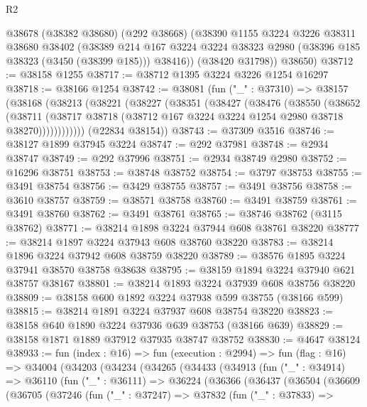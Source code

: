 \begin{lexlean}{R2}
\begin{coremodule}
      @38678
        (@38382 @38680)
        (@292 @38668)
        (@38390
          @1155
          @3224
          @3226
          @38311
          @38680
          @38402
          (@38389
            @214
            @167
            @3224
            @3224
            @38323
            @2980
            (@38396 @185 @38323 (@3450 (@38399 @185)))
            @38416))
        (@38420 @31798))
      @38650)
@38712 := @38158 @1255
@38717 := @38712 @1395 @3224 @3226 @1254 @16297
@38718 := @38166 @1254
@38742 := @38081
    (fun ("_" : @37310) =>
    @38157
      (@38168
        (@38213
          (@38221
            (@38227
              (@38351
                (@38427
                  (@38476
                    (@38550
                      (@38652
                        (@38711
                          (@38717
                            @38718
                            (@38712 @167 @3224 @3224 @1254 @2980 @38718 @38270))))))))))))
      (@22834 @38154))
@38743 := @37309 @3516
@38746 := @38127 @1899 @37945 @3224
@38747 := @292 @37981
@38748 := @2934 @38747
@38749 := @292 @37996
@38751 := @2934 @38749 @2980
@38752 := @16296 @38751
@38753 := @38748 @38752
@38754 := @3797 @38753
@38755 := @3491 @38754
@38756 := @3429 @38755
@38757 := @3491 @38756
@38758 := @3610 @38757
@38759 := @38571 @38758
@38760 := @3491 @38759
@38761 := @3491 @38760
@38762 := @3491 @38761
@38765 := @38746 @38762 (@3115 @38762)
@38771 := @38214 @1898 @3224 @37944 @608 @38761 @38220
@38777 := @38214 @1897 @3224 @37943 @608 @38760 @38220
@38783 := @38214 @1896 @3224 @37942 @608 @38759 @38220
@38789 := @38576 @1895 @3224 @37941 @38570 @38758 @38638
@38795 := @38159 @1894 @3224 @37940 @621 @38757 @38167
@38801 := @38214 @1893 @3224 @37939 @608 @38756 @38220
@38809 := @38158 @600 @1892 @3224 @37938 @599 @38755 (@38166 @599)
@38815 := @38214 @1891 @3224 @37937 @608 @38754 @38220
@38823 := @38158 @640 @1890 @3224 @37936 @639 @38753 (@38166 @639)
@38829 := @38158 @1871 @1889 @37912 @37935 @38747 @38752
@38830 := @4647 @38124
@38933 := fun (index : @16) =>
  fun (execution : @2994) =>
  fun (flag : @16) =>
  @34004
    (@34203
      (@34234
        (@34265
          (@34433
            (@34913
              (fun ("_" : @34914) =>
              @36110
                (fun ("_" : @36111) =>
                @36224
                  (@36366
                    (@36437
                      (@36504
                        (@36609
                          (@36705
                            (@37246
                              (fun ("_" : @37247) =>
                              @37832
                                (fun ("_" : @37833) =>

\end{coremodule}
\end{lexlean}
